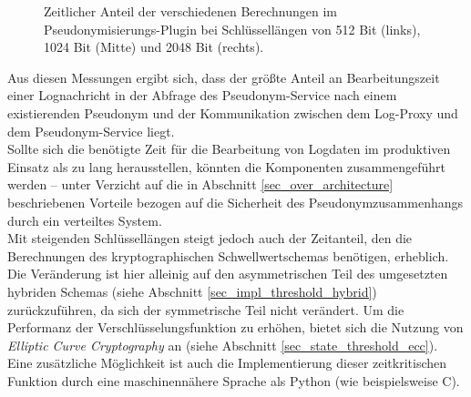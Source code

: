 \begin{figure}[]
    \centering
    \caption{Zeitlicher Anteil der verschiedenen Berechnungen im Pseudonymisierungs-Plugin bei  Schlüssellängen von 512 Bit (links), 1024 Bit (Mitte) und 2048 Bit (rechts).}
    \label{fig:eval_piecharts}
\end{figure}

Aus diesen Messungen ergibt sich, dass der größte Anteil an Bearbeitungszeit einer Lognachricht in der Abfrage des Pseudonym-Service nach einem existierenden Pseudonym und der Kommunikation zwischen dem Log-Proxy und dem Pseudonym-Service liegt.\\
Sollte sich die benötigte Zeit für die Bearbeitung von Logdaten im produktiven Einsatz als zu lang herausstellen, könnten die Komponenten zusammengeführt werden -- unter Verzicht auf die in Abschnitt \ref{sec_over_architecture} beschriebenen Vorteile bezogen auf die Sicherheit des Pseudonymzusammenhangs durch ein verteiltes System.\\
Mit steigenden Schlüssellängen steigt jedoch auch der Zeitanteil, den die Berechnungen des kryptographischen Schwellwertschemas benötigen, erheblich. Die Veränderung ist hier alleinig auf den asymmetrischen Teil des umgesetzten hybriden Schemas (siehe Abschnitt \ref{sec_impl_threshold_hybrid}) zurückzuführen, da sich der symmetrische Teil nicht verändert. Um die Performanz der Verschlüsselungsfunktion zu erhöhen, bietet sich die Nutzung von \textit{Elliptic Curve Cryptography} an (siehe Abschnitt \ref{sec_state_threshold_ecc}). Eine zusätzliche Möglichkeit ist auch die Implementierung dieser zeitkritischen Funktion durch eine maschinennähere Sprache als Python (wie beispielsweise C). 

